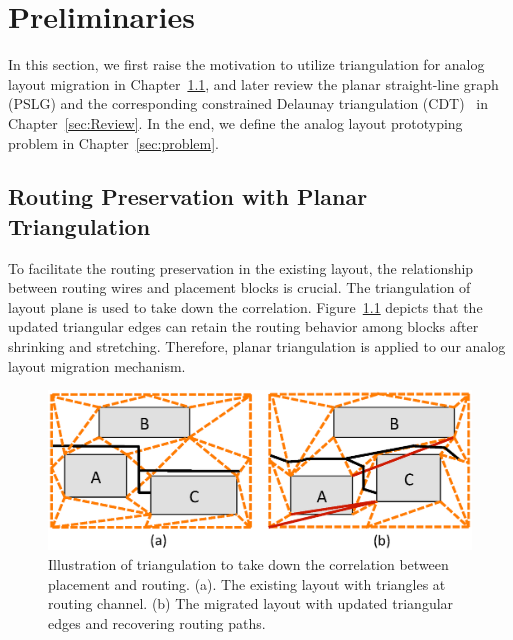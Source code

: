 
\chapter{Preliminaries}\label{chap:prelim}

  \newtheorem{defi}{Definition}

  In this section, we first raise the motivation to utilize triangulation for analog layout migration in Chapter~\ref{sec:WhyCDT}, and later review the planar straight-line graph (PSLG) and the corresponding constrained Delaunay triangulation (CDT)~\cite{CDT} in Chapter~\ref{sec:Review}. In the end, we define the analog layout prototyping problem in Chapter~\ref{sec:problem}.

  \section{Routing Preservation with Planar Triangulation}\label{sec:WhyCDT}

    To facilitate the routing preservation in the existing layout, the relationship between routing wires and placement blocks is crucial. The triangulation of layout plane is used to take down the correlation. Figure~\ref{fig:WhyCDT} depicts that the updated triangular edges can retain the routing behavior among blocks after shrinking and stretching. Therefore, planar triangulation is applied to our analog layout migration mechanism.

    \begin{figure}[ht]
      \begin{center}
        \includegraphics[width=\textwidth]{Fig/WhyCDT.eps}
        \caption{Illustration of triangulation to take down the correlation between placement and routing. (a). The existing layout with triangles at routing channel. (b) The migrated layout with updated triangular edges and recovering routing paths.}
        \label{fig:WhyCDT}
      \end{center}
    \end{figure}

